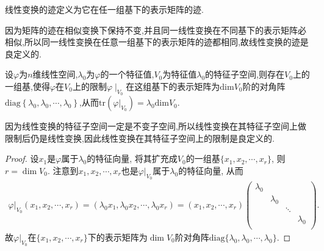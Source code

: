 \documentclass[../../main.tex]{subfiles}
\begin{document}
\begin{definition}[线性变换的迹]
线性变换的迹定义为它在任一组基下的表示矩阵的迹.
\end{definition}
\begin{note}
因为矩阵的迹在相似变换下保持不变,并且同一线性变换在不同基下的表示矩阵必相似,所以同一线性变换在任意一组基下的表示矩阵的迹都相同,故线性变换的迹是良定义的.
\end{note}

\begin{proposition}\label{proposition:线性变换在其特征子空间上的限制的表示矩阵及迹}
设$\varphi$为$n$维线性空间,$\lambda_0$为$\varphi$的一个特征值,$V_0$为特征值$\lambda_0$的特征子空间,则存在$V_0$上的一组基,使得$\varphi$在$V_0$上的限制$\varphi\mid_{V_0}$在这组基下的表示矩阵为$\mathrm{dim}V_0$阶的对角阵$\mathrm{diag}\left\{ \lambda _0,\lambda _0,\cdots ,\lambda _0 \right\}$,从而$\mathrm{tr}\left( \varphi |_{V_0} \right) =\lambda _0\mathrm{dim}V_0$.
\end{proposition}
\begin{remark}
因为线性变换的特征子空间一定是不变子空间,所以线性变换在其特征子空间上做限制后仍是线性变换,因此线性变换在其特征子空间上的限制是良定义的.
\end{remark}
\begin{proof}
设\(x_1\)是\(\varphi\)属于\(\lambda_0\)的特征向量, 将其扩充成\(V_0\)的一组基\(\{ x_1,x_2,\cdots ,x_r \}\), 则\(r = \dim V_0\).
注意到\(x_1,x_2,\cdots ,x_r\)也是\(\varphi|_{V_0}\)属于\(\lambda_0\)的特征向量, 从而
\begin{align*}
\varphi|_{V_0}( x_1,x_2,\cdots ,x_r )=(\lambda_0x_1,\lambda_0x_2,\cdots ,\lambda_0x_r)
=( x_1,x_2,\cdots ,x_r )\begin{pmatrix}
\lambda_0& & & \\
& \lambda_0& & \\
& & \ddots& \\
& & & \lambda_0\\
\end{pmatrix}.
\end{align*}
故\(\varphi|_{V_0}\)在\(\{ x_1,x_2,\cdots ,x_r \}\)下的表示矩阵为\(\dim V_0\)阶对角阵\(\mathrm{diag}\{ \lambda_0,\lambda_0,\cdots ,\lambda_0 \}\).

\end{proof}
\end{document}
